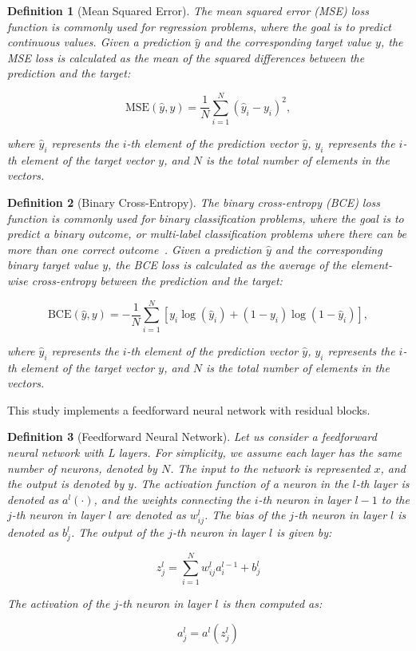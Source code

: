 \documentclass[ppgc,diss,english]{iiufrgs}
\newtheorem{definition}{Definition}
\begin{document}
\begin{definition}[Mean Squared Error]\label{def:mse}
The mean squared error (MSE) loss function is commonly used for regression problems, where the goal is to predict continuous values. Given a prediction $\hat{y}$ and the corresponding target value $y$, the MSE loss is calculated as the mean of the squared differences between the prediction and the target:

$$\text{MSE}(\hat{y}, y) = \frac{1}{N} \sum_{i=1}^{N} (\hat{y}_i - y_i)^2,$$

where $\hat{y}_i$ represents the $i$-th element of the prediction vector $\hat{y}$, $y_i$ represents the $i$-th element of the target vector $y$, and $N$ is the total number of elements in the vectors.
\end{definition}

\begin{definition}[Binary Cross-Entropy]\label{def:mse}
The binary cross-entropy (BCE) loss function is commonly used for binary classification problems, where the goal is to predict a binary outcome, or multi-label classification problems where there can be more than one correct outcome~\cite{Tsoumakas.etal/2007}.
Given a prediction $\hat{y}$ and the corresponding binary target value $y$, the BCE loss is calculated as the average of the element-wise cross-entropy between the prediction and the target:

$$\text{BCE}(\hat{y}, y) = -\frac{1}{N} \sum_{i=1}^{N} \left[y_i \log(\hat{y}_i) + (1 - y_i) \log(1 - \hat{y}_i)\right],$$

where $\hat{y}_i$ represents the $i$-th element of the prediction vector $\hat{y}$, $y_i$ represents the $i$-th element of the target vector $y$, and $N$ is the total number of elements in the vectors.
\end{definition}

This study implements a feedforward neural network with residual blocks.

\begin{definition}[Feedforward Neural Network]
Let us consider a feedforward neural network with L layers. For simplicity, we assume each layer has the same number of neurons, denoted by $N$. The input to the network is represented $x$, and the output is denoted by $y$. The activation function of a neuron in the $l$-th layer is denoted as $a^l(\cdot)$, and the weights connecting the $i$-th neuron in layer $l-1$ to the $j$-th neuron in layer $l$ are denoted as $w^{l}_{ij}$. The bias of the $j$-th neuron in layer $l$ is denoted as $b^{l}_{j}$. The output of the $j$-th neuron in layer $l$ is given by:

$$z^{l}_{j} = \sum_{i=1}^{N} w^{l}_{ij} a^{l-1}_{i} + b^{l}_{j}$$

The activation of the $j$-th neuron in layer $l$ is then computed as:

$$a^{l}_{j} = a^{l}(z^{l}_{j})$$
\end{definition}
\end{document}
